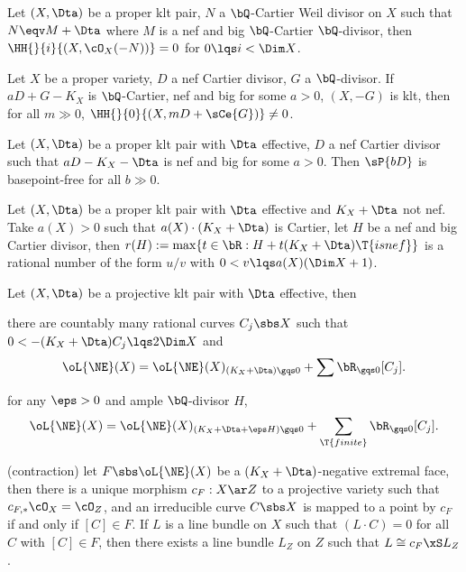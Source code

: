 \documentclass[article, a4paper, twoside]{universal}
\begin{document}
\begin{thm}
	Let $(X,\Dta)$ be a proper klt pair, $N$ a $\bQ$-Cartier Weil divisor on $X$ such that $N\eqv M+\Dta$ where $M$ is a nef and big $\bQ$-Cartier $\bQ$-divisor, then $\HH{}{i}{(X,\cO_{X}(-N))}=0$ for $0\lqs i <\Dim X$.
\end{thm}

\begin{thm}
	Let $X$ be a proper variety, $D$ a nef Cartier divisor, $G$ a $\bQ$-divisor. If $aD+G-K_{X}$ is $\bQ$-Cartier, nef and big for some $a>0$, $(X,-G)$ is klt, then for all $m\gg0$, $\HH{}{0}{(X,mD+\sCe{G})}\neq0$.
\end{thm}

\begin{thm}
	Let $(X,\Dta)$ be a proper klt pair with $\Dta$ effective, $D$ a nef Cartier divisor such that $aD-K_{X}-\Dta$ is nef and big for some $a>0$. Then $\sP{bD}$ is basepoint-free for all $b\gg0$.
\end{thm}

\begin{thm}[Rationality, 3.5]
	Let $(X,\Dta)$ be a proper klt pair with $\Dta$ effective and $K_{X}+\Dta$ not nef. Take $a(X)>0$ such that $a(X)\cdot(K_{X}+\Dta)$ is Cartier, let $H$ be a nef and big Cartier divisor, then $r(H):=\max\{t\in\bR:H+t(K_{X}+\Dta)\T{ is nef}\}$ is a rational number of the form $u/v$ with $0<v\lqs a(X)(\Dim X+1)$.
\end{thm}

\begin{thm}
	Let $(X,\Dta)$ be a projective klt pair with $\Dta$ effective, then
	\begin{enr}[label=(\arabic*)]
		\item there are countably many rational curves $C_{j}\sbs X$ such that $0<-(K_{X}+\Dta)C_{j}\lqs2\Dim X$ and
		\[
			\oL{\NE}(X)=\oL{\NE}(X)_{(K_{X}+\Dta)\gqs0}+\sum\bR_{\gqs0}[C_{j}].
		\]
		\item for any $\eps>0$ and ample $\bQ$-divisor $H$,
		\[
			\oL{\NE}(X)=\oL{\NE}(X)_{(K_{X}+\Dta+\eps H)\gqs0}+\sum_{\T{finite}}\bR_{\gqs0}[C_{j}].
		\]
		\item (contraction) let $F\sbs\oL{\NE}(X)$ be a $(K_{X}+\Dta)$-negative extremal face, then there is a unique morphism $c_{F}:X\ar Z$ to a projective variety such that $c_{F,*}\cO_{X}=\cO_{Z}$, and an irreducible curve $C\sbs X$ is mapped to a point by $c_{F}$ if and only if $[C]\in F$. If $L$ is a line bundle on $X$ such that $(L\cdot C)=0$ for all $C$ with $[C]\in F$, then there exists a line bundle $L_{Z}$ on $Z$ such that $L\cong c_{F}\xS L_{Z}$.
	\end{enr}
\end{thm}
\end{document}
